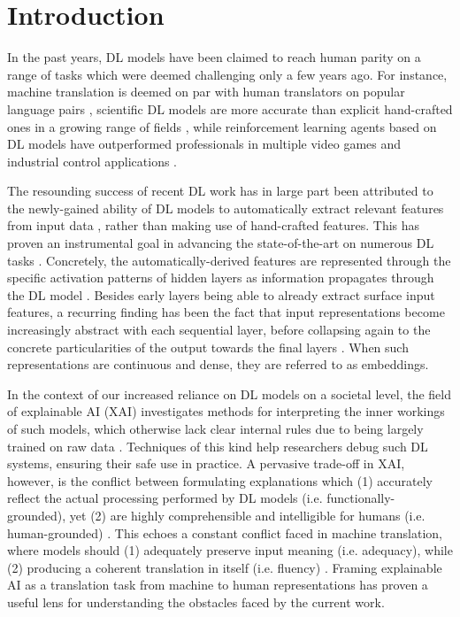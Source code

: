 \section{Introduction}\label{sec:introduction}

In the past years, DL models have been claimed to reach human parity on a range of tasks which were deemed challenging only a few years ago. For instance, machine translation is deemed on par with human translators on popular language pairs \citep{toral_attaining_2018}, scientific DL models are more accurate than explicit hand-crafted ones in a growing range of fields \citep{ravuri_skilful_2021}, while reinforcement learning agents based on DL models have outperformed professionals in multiple video games \citep{schrittwieser_mastering_2020} and industrial control applications \citep{degrave_magnetic_2022}.

The resounding success of recent DL work has in large part been attributed to the newly-gained ability of DL models to automatically extract relevant features from input data \citep{lecun_deep_2015}, rather than making use of hand-crafted features. This has proven an instrumental goal in advancing the state-of-the-art on numerous DL tasks \citep{radford_learning_2021} \citep{radford_improving_nodate}. Concretely, the automatically-derived features are represented through the specific activation patterns of hidden layers as information propagates through the DL model \citep{lecun_deep_2015}. Besides early layers being able to already extract surface input features, a recurring finding has been the fact that input representations become increasingly abstract with each sequential layer, before collapsing again to the concrete particularities of the output towards the final layers \citep{tenney_bert_2019}. When such representations are continuous and dense, they are referred to as embeddings.

In the context of our increased reliance on DL models on a societal level, the field of explainable AI (XAI) investigates methods for interpreting the inner workings of such models, which otherwise lack clear internal rules due to being largely trained on raw data \citep{arrieta_explainable_2019}. Techniques of this kind help researchers debug such DL systems, ensuring their safe use in practice. A pervasive trade-off in XAI, however, is the conflict between formulating explanations which (1) accurately reflect the actual processing performed by DL models (i.e. functionally-grounded), yet (2) are highly comprehensible and intelligible for humans (i.e. human-grounded) \citep{madsen_post-hoc_2021}. This echoes a constant conflict faced in machine translation, where models should (1) adequately preserve input meaning (i.e. adequacy), while (2) producing a coherent translation in itself (i.e. fluency) \citep{koehn_neural_2017}. Framing explainable AI as a translation task from machine to human representations has proven a useful lens for understanding the obstacles faced by the current work.

